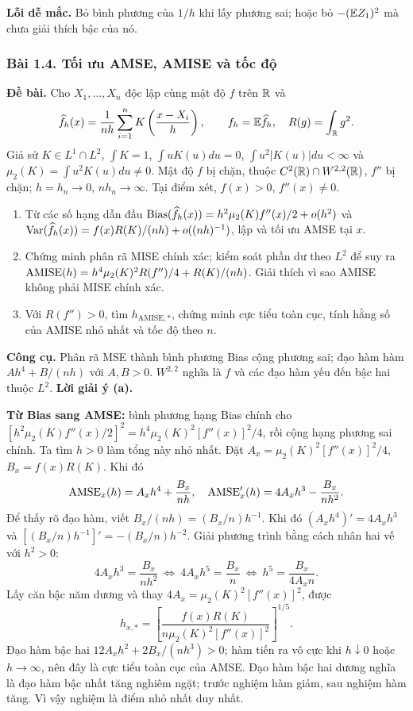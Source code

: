 \textbf{Lỗi dễ mắc.} Bỏ bình phương của $1/h$ khi lấy phương sai;
hoặc bỏ $-(\mathbb E Z_1)^2$ mà chưa giải thích bậc của nó.

\subsubsection*{Bài 1.4. Tối ưu AMSE, AMISE và tốc độ}\label{ot45:kde-optimal}
\textbf{Đề bài.} Cho $X_1,\ldots,X_n$ độc lập cùng mật độ $f$ trên $\mathbb R$ và
\[
\widehat f_h(x)=\frac1{nh}\sum_{i=1}^nK\left(\frac{x-X_i}{h}\right),\qquad
f_h=\mathbb E\widehat f_h,\quad R(g)=\int_{\mathbb R}g^2.
\]
Giả sử $K\in L^1\cap L^2$, $\int K=1$, $\int uK(u)du=0$,
$\int u^2|K(u)|du<\infty$ và $\mu_2(K)=\int u^2K(u)du\ne0$.
Mật độ $f$ bị chặn, thuộc $C^2(\mathbb R)\cap W^{2,2}(\mathbb R)$, $f''$ bị chặn;
$h=h_n\to0$, $nh_n\to\infty$. Tại điểm xét, $f(x)>0$, $f''(x)\ne0$.
\begin{enumerate}[label=(\alph*)]
\item Từ các số hạng dẫn đầu
$\operatorname{Bias}(\widehat f_h(x))=h^2\mu_2(K)f''(x)/2+o(h^2)$ và
$\operatorname{Var}(\widehat f_h(x))=f(x)R(K)/(nh)+o((nh)^{-1})$,
lập và tối ưu AMSE tại $x$.
\item Chứng minh phân rã MISE chính xác; kiểm soát phần dư theo $L^2$ để suy ra
$\operatorname{AMISE}(h)=h^4\mu_2(K)^2R(f'')/4+R(K)/(nh)$.
Giải thích vì sao AMISE không phải MISE chính xác.
\item Với $R(f'')>0$, tìm $h_{\mathrm{AMISE},*}$, chứng minh cực tiểu toàn cục,
tính hằng số của AMISE nhỏ nhất và tốc độ theo $n$.
\end{enumerate}

\textbf{Công cụ.} Phân rã MSE thành bình phương Bias cộng phương sai;
đạo hàm hàm $Ah^4+B/(nh)$ với $A,B>0$.
$W^{2,2}$ nghĩa là $f$ và các đạo hàm yếu đến bậc hai thuộc $L^2$.
\textbf{Lời giải ý (a).}

\textbf{Từ Bias sang AMSE:} bình phương hạng Bias chính cho
$[h^2\mu_2(K)f''(x)/2]^2=h^4\mu_2(K)^2[f''(x)]^2/4$,
rồi cộng hạng phương sai chính. Ta tìm $h>0$ làm tổng này nhỏ nhất.
Đặt $A_x=\mu_2(K)^2[f''(x)]^2/4$, $B_x=f(x)R(K)$. Khi đó
\[
\operatorname{AMSE}_x(h)=A_xh^4+\frac{B_x}{nh},\quad
\operatorname{AMSE}_x'(h)=4A_xh^3-\frac{B_x}{nh^2}.
\]
Để thấy rõ đạo hàm, viết $B_x/(nh)=(B_x/n)h^{-1}$.
Khi đó $(A_xh^4)'=4A_xh^3$ và $[(B_x/n)h^{-1}]'=-(B_x/n)h^{-2}$.
Giải phương trình bằng cách nhân hai vế với $h^2>0$:
\[
4A_xh^3=\frac{B_x}{nh^2}
\ \Longleftrightarrow\ 4A_xh^5=\frac{B_x}{n}
\ \Longleftrightarrow\ h^5=\frac{B_x}{4A_xn}.
\]
Lấy căn bậc năm dương và thay $4A_x=\mu_2(K)^2[f''(x)]^2$, được
\[
\boxed{h_{x,*}=\left[\frac{f(x)R(K)}{n\mu_2(K)^2[f''(x)]^2}\right]^{1/5}.}
\]
Đạo hàm bậc hai $12A_xh^2+2B_x/(nh^3)>0$; hàm tiến ra vô cực khi $h\downarrow0$
hoặc $h\to\infty$, nên đây là cực tiểu toàn cục của AMSE.
Đạo hàm bậc hai dương nghĩa là đạo hàm bậc nhất tăng nghiêm ngặt;
trước nghiệm hàm giảm, sau nghiệm hàm tăng. Vì vậy nghiệm là điểm nhỏ nhất duy nhất.

